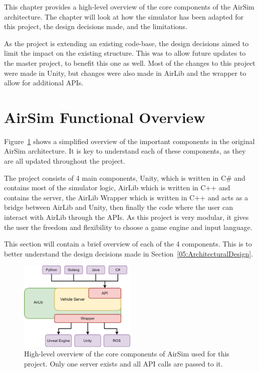 This chapter provides a high-level overview of the core components of the AirSim architecture. The chapter will look at how the simulator has been adapted for this project, the design decisions made, and the limitations. 

As the project is extending an existing code-base, the design decisions aimed to limit the impact on the existing structure. This was to allow future updates to the master project, to benefit this one as well. Most of the changes to this project were made in Unity, but changes were also made in AirLib and the wrapper to allow for additional APIs. 

\section{AirSim Functional Overview}
Figure~\ref{ADA:Figure:OriginalOverview} shows a simplified overview of the important components in the original AirSim architecture. It is key to understand each of these components, as they are all updated throughout the project. 


The project consists of 4 main components, Unity, which is written in C\# and contains most of the simulator logic, AirLib which is written in C++ and contains the server, the AirLib Wrapper which is written in C++ and acts as a bridge between AirLib and Unity, then finally the code where the user can interact with AirLib through the APIs. As this project is very modular, it gives the user the freedom and flexibility to choose a game engine and input language. 

This section will contain a brief overview of each of the 4 components. This is to better understand the design decisions made in Section~\ref{05:ArchitecturalDesign}.

\begin{figure}[h]
    \centering
    \includegraphics[width=0.5\textwidth]{05_AnalysisAndDesign/Diagrams/OriginalOverview.png}
    \caption{High-level overview of the core components of AirSim used for this project. Only one server exists and all API calls are passed to it.}
    \label{ADA:Figure:OriginalOverview}
\end{figure}


